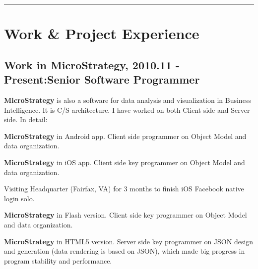 \documentclass[letterpaper]{article}
\renewenvironment{itemize}{
  \begin{list}{}{
    \setlength{\leftmargin}{1.5em}
    \setlength{\itemsep}{0pt}
  }
}{
  \end{list}
}
\begin{document}

\rule{16.8cm}{0.1em}

\vspace{-1.5em}
\section*{Work \& Project Experience}
\subsection*{Work in MicroStrategy, 2010.11 - Present:\hfill Senior Software Programmer}
\begin{itemize}
\item \textbf{MicroStrategy} is also a software for data analysis and visualization in Business Intelligence. It is C/S architecture. I have worked on both Client side and Server side. In detail:
\item \textbf{MicroStrategy} in Android app. Client side programmer on Object Model and data organization.
\item \textbf{MicroStrategy} in iOS app. Client side key programmer on Object Model and data organization.
\item Visiting Headquarter (Fairfax, VA) for 3 months to finish iOS Facebook native login solo.
\item \textbf{MicroStrategy} in Flash version. Client side key programmer on Object Model and data organization.
\item \textbf{MicroStrategy} in HTML5 version. Server side key programmer on JSON design and generation (data rendering is based on JSON), which made big progress in program stability and performance.
\end{itemize}
\end{document}
